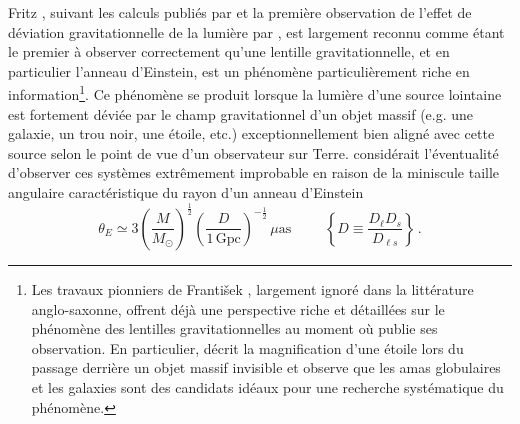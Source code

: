 Fritz \citet{Zwicky1937}, suivant les calculs publiés par \citet{Einstein1936} et la première observation 
de l'effet de déviation gravitationnelle de la lumière par \citet{Eddington1919}, 
est largement reconnu comme étant le premier à observer correctement qu'une lentille gravitationnelle, et en particulier 
l'anneau d'Einstein, 
est un phénomène particulièrement riche en information\footnote{ 
        Les travaux pionniers de Franti\v{s}ek \citet{Link1936,Link1937}, largement ignoré dans la littérature anglo-saxonne, %
        offrent déjà une perspective riche et détaillées sur le phénomène des lentilles gravitationnelles au moment où \citet{Zwicky1937} publie 
        ses observation. 
        En particulier, \citet{Link1936} décrit la magnification d'une étoile lors du passage derrière un objet massif invisible et 
        observe que les amas globulaires et les galaxies sont des candidats idéaux pour une recherche systématique du 
        phénomène.
        }. 
Ce phénomène se produit lorsque la lumière d'une source lointaine est fortement déviée par le champ gravitationnel d'un objet massif 
(e.g. une galaxie, un trou noir, une étoile, etc.) 
exceptionnellement bien aligné avec cette source selon le point de vue d'un observateur sur Terre.
\citet{Einstein1936} considérait l'éventualité d'observer ces systèmes extrêmement 
improbable en raison de la miniscule taille angulaire caractéristique du rayon d'un 
anneau d'Einstein \citep{Chwolson1924,Einstein1936} 
\begin{equation}\label{eq:Taille Lentille}
        \theta_E \simeq 3\left( \frac{M}{M_{\odot}} \right)^{\frac{1}{2}} \left( \frac{D}{1\, \mathrm{Gpc}} \right)^{-\frac{1}{2}}\, \mu\mathrm{as} \hspace{1cm} \left\{D \equiv \frac{D_{\ell} D_s}{D_{\ell s}}\right\}\, .
\end{equation}
